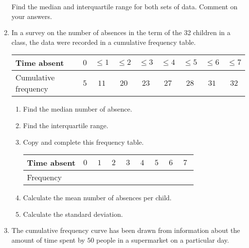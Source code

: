 \begin{enumerate}
\begin{table}[!htpb]
 \end{table}


Find the median and interquartile range for both sets of data. Comment on your answers. 


\item  In a survey on the number of absences in the term of the 32 children in a class, the data were recorded in a cumulative frequency table.

	\medskip

\renewcommand{\arraystretch}{1.2} %
\begin{tabular}{|l|c|c|c|c|c|c|c|c|}
	\hline
	Time absent  & $0$ & $\leqslant 1$ & $\leqslant 2$ & $\leqslant 3$ & $\leqslant 4$ &  $\leqslant 5$ & $\leqslant 6$ & $\leqslant 7$  \\ 
	\hline
	Cumulative frequency & $5$ & $11$ & $20$ & $23$ & $27$ & $28$ & $31$ & $32$ \\ 
	\hline
\end{tabular}

\smallskip

\begin{enumerate}
	\item Find the median number of absence.
	\item Find the interquartile range.
	\item Copy and complete this frequency table.
		\medskip
	
	\renewcommand{\arraystretch}{1.2} %
	\begin{tabular}{|l|c|c|c|c|c|c|c|c|}
		\hline
		Time absent  & $0 \,\,$  & $ 1 \,\, $ & $ 2 \,\,$  & $ 3 \,\,$& $  4 \,\, $ &  $5 \,\,$ & $ 6 \,\,$ & $ 7 \,\,$  \\ 
		\hline
		Frequency & & & &&&&&\\ 
		\hline
	\end{tabular}
	
	\smallskip
	
	\item Calculate the mean number of absences per child.
	\item Calculate the standard deviation.
	
	
\end{enumerate}

\item  The cumulative frequency curve has been drawn from information about the amount of time spent by $50$ people in a supermarket on a particular day.


\end{enumerate}
